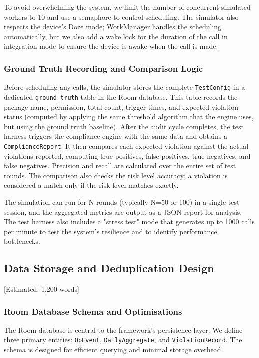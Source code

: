 To avoid overwhelming the system, we limit the number of concurrent simulated workers to 10 and use a semaphore to control scheduling. The simulator also respects the device's Doze mode; WorkManager handles the scheduling automatically, but we also add a wake lock for the duration of the call in integration mode to ensure the device is awake when the call is made.

\subsubsection{Ground Truth Recording and Comparison Logic}

Before scheduling any calls, the simulator stores the complete \texttt{TestConfig} in a dedicated \texttt{ground\_truth} table in the Room database. This table records the package name, permission, total count, trigger times, and expected violation status (computed by applying the same threshold algorithm that the engine uses, but using the ground truth baseline). After the audit cycle completes, the test harness triggers the compliance engine with the same data and obtains a \texttt{ComplianceReport}. It then compares each expected violation against the actual violations reported, computing true positives, false positives, true negatives, and false negatives. Precision and recall are calculated over the entire set of test rounds. The comparison also checks the risk level accuracy; a violation is considered a match only if the risk level matches exactly.

The simulation can run for N rounds (typically N=50 or 100) in a single test session, and the aggregated metrics are output as a JSON report for analysis. The test harness also includes a "stress test" mode that generates up to 1000 calls per minute to test the system's resilience and to identify performance bottlenecks.

\subsection{Data Storage and Deduplication Design} [Estimated: 1,200 words]

\subsubsection{Room Database Schema and Optimisations}

The Room database is central to the framework's persistence layer. We define three primary entities: \texttt{OpEvent}, \texttt{DailyAggregate}, and \texttt{ViolationRecord}. The schema is designed for efficient querying and minimal storage overhead.

